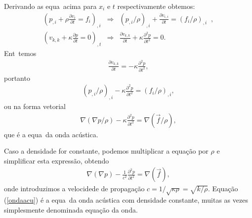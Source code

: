Derivando as equa\coes\ acima para $x_i$ e $t$ respectivamente obtemos:
\begin{eqnarray}
(p_{,i} + \rho\frac{\partial v_i}{\partial t} = f_i)_{,i} &\Rightarrow& 
(p_{,i}/\rho)_{,i} + \frac{\partial v_{i,i}}{\partial t} = (f_i/\rho)_{,i} \;\; , \\
(v_{k,k} + \kappa\frac{\partial p}{\partial t} = 0)_{,t} &\Rightarrow&
\frac{\partial v_{k,k}}{\partial t} + \kappa\frac{\partial^2 p}{\partial t^2} = 0.
\end{eqnarray}
Ent\ao\ temos
\begin{eqnarray}
\frac{\partial v_{k,k}}{\partial t} = -\kappa\frac{\partial^2 p}{\partial t^2},
\end{eqnarray}
portanto
\begin{eqnarray}
(p_{,i}/\rho)_{,i} - \kappa\frac{\partial^2 p}{\partial t^2} = (f_i/\rho)_{,i},
\end{eqnarray}
ou na forma vetorial
\begin{eqnarray}
\nabla(\nabla p/\rho) - \kappa\frac{\partial^2 p}{\partial t^2} = \nabla(\vec{f}/\rho),
\end{eqnarray}
que \'e a equa\cao\ da onda ac\'ustica.

Caso a densidade for constante, podemos multiplicar a equa\c{c}\~ao por
$\rho$ e simplificar esta express\~ao, 
obtendo
\begin{eqnarray}
\nabla(\nabla p) - \frac{1}{c^2}\frac{\partial^2 p}{\partial t^2} = \nabla(\vec{f}),
\label{ondaacu}
\end{eqnarray}
onde introduzimos a velocidede de propaga\c{c}\~ao
$c=1/\sqrt{\kappa\rho}=\sqrt{k/\rho}$. Equa\c{c}\~ao (\ref{ondaacu})
\'e a equa\cao\ da onda ac\'ustica com densidade constante, muitas
as vezes simplesmente denominada equa\c{c}\~ao da onda.
%

